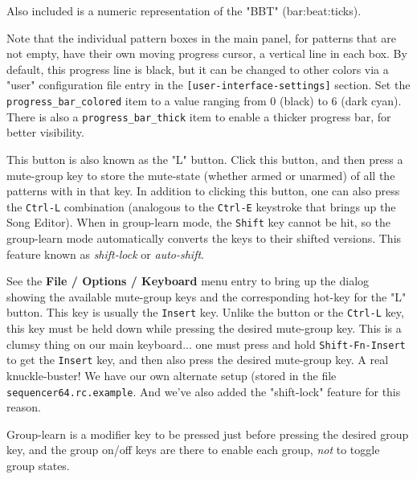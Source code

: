    Also included is a numeric representation of the "BBT" (bar:beat:ticks).
 
   Note that the individual pattern boxes in the main panel, for
   patterns that are not empty, have their own
   moving progress cursor, a vertical line in each box.
   By default, this progress line is black, but it can be changed to
   other colors via a "user" configuration file entry in the 
   \texttt{[user-interface-settings]} section.
   Set the \texttt{progress\_bar\_colored} item to a value ranging from 0
   (black) to 6 (dark cyan).
   There is also a \texttt{progress\_bar\_thick} item to enable a thicker
   progress bar, for better visibility.


   This button is also known as the "L" button.
   Click this button, and then press a mute-group key
   to store the mute-state (whether armed or unarmed)
   of all the patterns with in that key.
   In addition to clicking this button, one can also press
   the \texttt{Ctrl-L} combination (analogous to the \texttt{Ctrl-E}
   keystroke that brings up the Song Editor).
   When in group-learn mode, the \texttt{Shift} key cannot be hit, so the
   group-learn mode automatically converts the keys to their shifted versions.
   This feature known as \textsl{shift-lock} or \textsl{auto-shift}.

   See the \textbf{File / Options / Keyboard} menu entry to bring up the
   dialog showing the available mute-group keys and the corresponding
   hot-key for the "L" button.
   This key is usually the \texttt{Insert} key.  Unlike the button or the
   \texttt{Ctrl-L} key, this key must be held down while pressing the desired
   mute-group key.
   This is a clumsy thing on our main keyboard... one must press and hold
   \texttt{Shift-Fn-Insert} to get the \texttt{Insert} key, and then also
   press the desired mute-group key.  A real knuckle-buster!
   We have our own alternate setup (stored in the file
   \texttt{sequencer64.rc.example}.
   And we've also added the "shift-lock" feature for this reason.

   Group-learn is a modifier key to be pressed
   just before pressing
   the desired group key, and the group on/off keys are there to enable
   each group, \textsl{not} to toggle group states.


